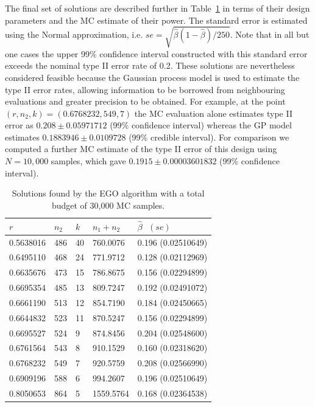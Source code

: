 \documentclass{article} %
\begin{document}
The final set of solutions are described further in Table~\ref{tab:single_run} in terms of their design parameters and the MC estimate of their power. The standard error is estimated using the Normal approximation, i.e. $se = \sqrt{\hat{\beta}(1-\hat{\beta})/250}$. Note that in all but one cases the upper 99\% confidence interval constructed with this standard error exceeds the nominal type II error rate of 0.2. These solutions are nevertheless considered feasible because the Gaussian process model is used to estimate the type II error rates, allowing information to be borrowed from neighbouring evaluations and greater precision to be obtained. For example, at the point $(r, n_{2}, k) = (0.6768232, 549, 7)$ the MC evaluation alone estimates type II error as $0.208 \pm 0.05971712$ (99\% confidence interval) whereas the GP model estimates $0.1883946 \pm 0.0109728$ (99\% credible interval). For comparison we computed a further MC estimate of the type II error of this design using $N = 10,000$ samples, which gave $0.1915 \pm 0.00003601832$ (99\% confidence interval).

\begin{table}
\centering
\begin{tabular}{l l l l l}
\toprule
$r$ & $n_{2}$ & $k$ & $n_{1} + n_{2}$ & $\hat{\beta} \text{ } (se)$ \\
\midrule
0.5638016 & 486 & 40 &  760.0076 & 0.196 (0.02510649) \\
0.6495110 & 468 & 24 &  771.9712 & 0.128 (0.02112969) \\
0.6635676 & 473 & 15 &  786.8675 & 0.156 (0.02294899) \\
0.6695354 & 485 & 13 &  809.7247 & 0.192 (0.02491072) \\
0.6661190 & 513 & 12 &  854.7190 & 0.184 (0.02450665) \\
0.6644832 & 523 & 11 &  870.5247 & 0.156 (0.02294899) \\
0.6695527 & 524 &  9 &  874.8456 & 0.204 (0.02548600) \\
0.6761564 & 543 &  8 &  910.1529 & 0.160 (0.02318620) \\
0.6768232 & 549 &  7 &  920.5759 & 0.208 (0.02566990) \\
0.6909196 & 588 &  6 &  994.2607 & 0.196 (0.02510649) \\
0.8050653 & 864 &  5 & 1559.5764 & 0.168 (0.02364538) \\
\bottomrule
\end{tabular}
\caption{Solutions found by the EGO algorithm with a total budget of 30,000 MC samples.}
\label{tab:single_run}
\end{table}
\end{document}
